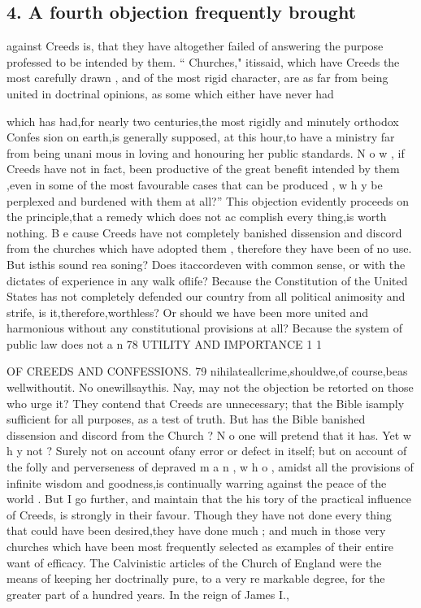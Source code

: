 \documentclass[
]{book}
\begin{document}
\hypertarget{a-fourth-objection-frequently-brought}{%
\subsection{4. A fourth objection frequently brought}\label{a-fourth-objection-frequently-brought}}

against Creeds is, that they have altogether
failed of answering the purpose professed to
be intended by them. `` Churches," itissaid, which have Creeds the most carefully drawn ,
and of the most rigid character, are as far
from being united in doctrinal opinions, as some which either have never had

which has had,for nearly two centuries,the
most rigidly and minutely orthodox Confes
sion on earth,is generally supposed, at this
hour,to have a ministry far from being unani
mous in loving and honouring her public
standards. N o w , if Creeds have not in fact,
been productive of the great benefit intended
by them ,even in some of the most favourable
cases that can be produced , w h y be perplexed and burdened with them at all?''
This objection evidently proceeds on the principle,that a remedy which does not ac complish every thing,is worth nothing. B e
cause Creeds have not completely banished dissension and discord from the churches
which have adopted them , therefore they have been of no use. But isthis sound rea soning? Does itaccordeven with common
sense, or with the dictates of experience in any walk oflife? Because the Constitution of the United States has not completely defended our country from all political animosity and strife, is it,therefore,worthless? Or should we have been more united and harmonious without any constitutional provisions at all? Because the system of public law does not a n
78
UTILITY AND IMPORTANCE
1
1

OF CREEDS AND CONFESSIONS. 79
nihilateallcrime,shouldwe,of course,beas wellwithoutit. No onewillsaythis. Nay, may not the objection be retorted on those who urge it? They contend that Creeds are unnecessary; that the Bible isamply sufficient
for all purposes, as a test of truth. But has the Bible banished dissension and discord from the Church ? N o one will pretend that it has. Yet w h y not ? Surely not on account ofany error or defect in itself; but on account of the folly and perverseness of depraved m a n , w h o , amidst all the provisions of infinite wisdom and goodness,is continually warring against the peace of the world .
But I go further, and maintain that the his tory of the practical influence of Creeds, is strongly in their favour. Though they have
not done every thing that could have been
desired,they have done much ; and much in
those very churches which have been most
frequently selected as examples of their entire want of efficacy. The Calvinistic articles of
the Church of England were the means of keeping her doctrinally pure, to a very re markable degree, for the greater part of a
hundred years. In the reign of James I.,
\end{document}

